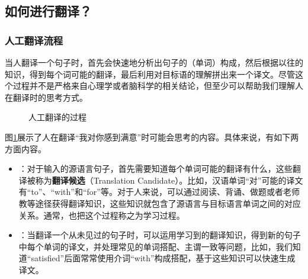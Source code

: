 \subsection{如何进行翻译？}


\subsubsection*{人工翻译流程}

\parinterval 当人翻译一个句子时，首先会快速地分析出句子的（单词）构成，然后根据以往的知识，得到每个词可能的翻译，最后利用对目标语的理解拼出来一个译文。尽管这个过程并不是严格来自心理学或者脑科学的相关结论，但至少可以帮助我们理解人在翻译时的思考方式。

\begin{figure}[htp]
    \centering

    \caption{人工翻译的过程}
    \label{fig:3-3}
\end{figure}
\vspace{-0.2em}

\parinterval 图\ref{fig:3-3}展示了人在翻译``我\;对\;你\;感到\;满意''时可能会思考的内容。具体来说，有如下两方面内容。

\begin{itemize}
\vspace{0.5em}
\item {\small{}}：对于输入的源语言句子，首先需要知道每个单词可能的翻译有什么，这些翻译被称为{\small\sffamily\bfseries{翻译候选}}（Translation Candidate）。比如，汉语单词``对''可能的译文有``to''、``with''和``for''等。对于人来说，可以通过阅读、背诵、做题或者老师教等途径获得翻译知识，这些知识就包含了源语言与目标语言单词之间的对应关系。通常，也把这个过程称之为学习过程。
\vspace{0.5em}
\item {\small{}}：当翻译一个从未见过的句子时，可以运用学习到的翻译知识，得到新的句子中每个单词的译文，并处理常见的单词搭配、主谓一致等问题，比如，我们知道``satisfied''后面常常使用介词``with''构成搭配，基于这些知识可以快速生成译文。
\vspace{0.5em}
\end{itemize}

